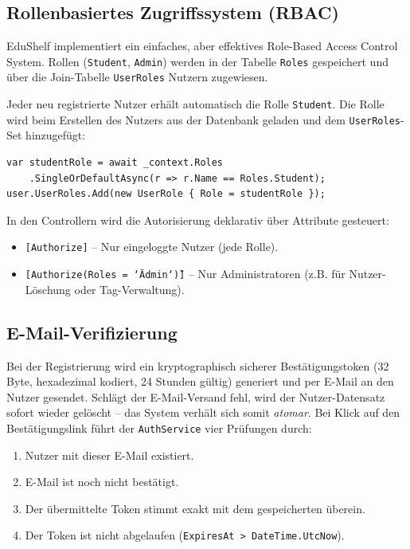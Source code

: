 \subsection{Rollenbasiertes Zugriffssystem (RBAC)}
EduShelf implementiert ein einfaches, aber effektives Role-Based Access Control System. Rollen (\texttt{Student}, \texttt{Admin}) werden in der Tabelle \texttt{Roles} gespeichert und über die Join-Tabelle \texttt{UserRoles} Nutzern zugewiesen.

Jeder neu registrierte Nutzer erhält automatisch die Rolle \texttt{Student}. Die Rolle wird beim Erstellen des Nutzers aus der Datenbank geladen und dem \texttt{UserRoles}-Set hinzugefügt:

\begin{lstlisting}[language={[Sharp]C}, caption={Automatische Rollenzuweisung bei der Registrierung}]
var studentRole = await _context.Roles
    .SingleOrDefaultAsync(r => r.Name == Roles.Student);
user.UserRoles.Add(new UserRole { Role = studentRole });
\end{lstlisting}

In den Controllern wird die Autorisierung deklarativ über Attribute gesteuert:
\begin{itemize}
    \item \texttt{[Authorize]} -- Nur eingeloggte Nutzer (jede Rolle).
    \item \texttt{[Authorize(Roles = \char`\"Admin\char`\")]} -- Nur Administratoren (z.B. für Nutzer-Löschung oder Tag-Verwaltung).
\end{itemize}

\subsection{E-Mail-Verifizierung}
Bei der Registrierung wird ein kryptographisch sicherer Bestätigungstoken (32 Byte, hexadezimal kodiert, 24 Stunden gültig) generiert und per E-Mail an den Nutzer gesendet. Schlägt der E-Mail-Versand fehl, wird der Nutzer-Datensatz sofort wieder gelöscht -- das System verhält sich somit \textit{atomar}. Bei Klick auf den Bestätigungslink führt der \texttt{AuthService} vier Prüfungen durch:

\begin{enumerate}
    \item Nutzer mit dieser E-Mail existiert.
    \item E-Mail ist noch nicht bestätigt.
    \item Der übermittelte Token stimmt exakt mit dem gespeicherten überein.
    \item Der Token ist nicht abgelaufen (\texttt{ExpiresAt > DateTime.UtcNow}).
\end{enumerate}

